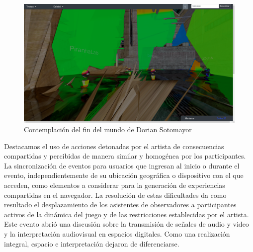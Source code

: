 \begin{figure}
  \includegraphics[width=\textwidth]{img/contemplacion01.png}
  \caption{Contemplación del fin del mundo de Dorian Sotomayor}
  \label{fig:contemplacion}
\end{figure}

Destacamos el uso de acciones detonadas por el artista de consecuencias compartidas y percibidas de manera similar y homogénea por los participantes. La sincronización de eventos para usuarios que ingresan al inicio o durante el evento, independientemente de su ubicación geográfica o dispositivo con el que acceden, como elementos a considerar para la generación de experiencias compartidas en el navegador. La resolución de estas dificultades da como resultado el desplazamiento de los asistentes de observadores a participantes activos de la dinámica del juego y de las restricciones establecidas por el artista. Este evento abrió una discusión sobre la transmisión de señales de audio y video y la interpretación audiovisual en espacios digitales. Como una realización integral, espacio e interpretación dejaron de diferenciarse. 

